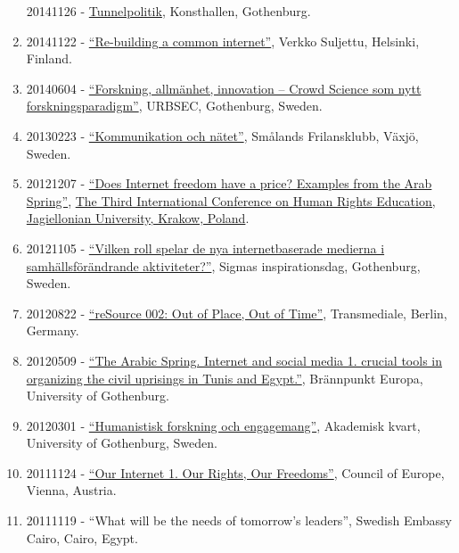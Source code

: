 \documentclass[
]{article}
\begin{document}
\begin{enumerate}
  20141126 -
  \href{http://www.wherevent.com/detail/Goteborgs-Konsthall-TUNNELPOLITIK-Forelasning-med-Christopher-Kullenberg}{Tunnelpolitik},
  Konsthallen, Gothenburg.
\item
  20141122 -
  \href{https://www.facebook.com/events/622473101197803/}{``Re-building
  a common internet''}, Verkko Suljettu, Helsinki, Finland.
\item
  20140604 -
  \href{http://www.urbsec.se/digitalAssets/1483/1483366_program-urbsec-konferens-2014-06-04.pdf}{``Forskning,
  allmänhet, innovation -- Crowd Science som nytt forskningsparadigm''},
  URBSEC, Gothenburg, Sweden.
\item
  20130223 -
  \href{http://www.frilansjournalisten.nu/2013/01/sasong-for-arsmoten/}{``Kommunikation
  och nätet''}, Smålands Frilansklubb, Växjö, Sweden.
\item
  20121207 -
  \href{http://letstudio.gu.se/svenska/aktuellt/nyheter/n/christopher-kullenberg-inbjuden-som-talare-pa-internationell-konferens.cid1111971}{``Does
  Internet freedom have a price? Examples from the Arab Spring''},
  \href{http://www.hre2012.uj.edu.pl/invited-speakers}{The Third
  International Conference on Human Rights Education, Jagiellonian
  University, Krakow, Poland}.
\item
  20121105 - \href{https://www.youtube.com/watch?v=Zo24Qy_PU8I}{``Vilken
  roll spelar de nya internetbaserade medierna i samhällsförändrande
  aktiviteter?''}, Sigmas inspirationsdag, Gothenburg, Sweden.
\item
  20120822 -
  \href{https://transmediale.de/content/resource-002-out-place-out-time}{``reSource
  002: Out of Place, Out of Time''}, Transmediale, Berlin, Germany.
\item
  20120509 -
  \href{http://pol.gu.se/aktuellt/kalendarium/aktuellt_detalj/?eventId=1777397828}{``The
  Arabic Spring. Internet and social media 1. crucial tools in
  organizing the civil uprisings in Tunis and Egypt.''}, Brännpunkt
  Europa, University of Gothenburg.
\item
  20120301 -
  \href{http://www.youtube.com/watch?v=-HYfVmanye8}{``Humanistisk
  forskning och engagemang''}, Akademisk kvart, University of
  Gothenburg, Sweden.
\item
  20111124 - \href{https://www.youtube.com/watch?v=zWROWpMaKmE}{``Our
  Internet 1. Our Rights, Our Freedoms''}, Council of Europe, Vienna,
  Austria.
\item
  20111119 - ``What will be the needs of tomorrow's leaders'', Swedish
  Embassy Cairo, Cairo, Egypt.

\end{enumerate}
\end{document}
